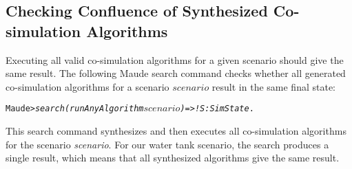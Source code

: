 \subsection{Checking Confluence of Synthesized Co-simulation
  Algorithms} 
Executing all valid co-simulation algorithms for a given  scenario
should give the same  result. The following Maude search command
 checks whether all generated co-simulation
algorithms for a  scenario \(\mathit{scenario}\) result in the same
final state:

\small
\begin{alltt}
Maude> \emph{search (runAnyAlgorithm \(\mathit{scenario}\)) =>! S:SimState} . 
\end{alltt}
\normalsize

\noindent 
This search command synthesizes and then executes all co-simulation
algorithms for the scenario \emph{scenario}.  
For our  water tank scenario, the search
produces a single result, which means that all synthesized algorithms
give the same result. 
%
%
